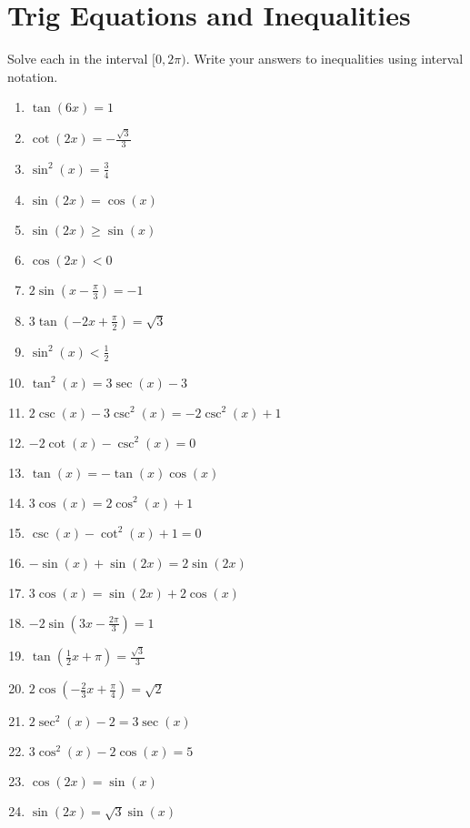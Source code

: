 \chapter{Trig Equations and Inequalities}

Solve each in the interval $[0,2\pi)$. Write your answers to inequalities using interval notation.

\begin{enumerate}
	\item $\tan(6x) = 1$
    \item $\cot(2x) = -\frac{\sqrt{3}}{3}$
    \item $\sin^2 (x) = \frac{3}{4}$
    \item $\sin(2x) = \cos(x)$
    \item $\sin(2x) \geq \sin(x)$
    \item $\cos(2x) < 0$
    \item $2\sin\left(x-\frac{\pi}{3}\right) = -1$
    \item $3\tan\left(-2x+\frac{\pi}{2}\right)=\sqrt{3}$
    \item $\sin^2(x) < \frac{1}{2}$
    
    \item $\tan^2(x) = 3\sec(x) - 3$
    \item $2\csc(x) - 3\csc^2(x) = -2\csc^2(x) + 1$
    \item $-2\cot(x) - \csc^2(x) = 0$
    \item $\tan(x) = -\tan(x)\cos(x)$
    \item $3\cos(x) = 2\cos^2(x) + 1$
    \item $\csc(x) - \cot^2(x) + 1 = 0$
    \item $-\sin(x) + \sin(2x) = 2\sin(2x)$
    \item $3\cos(x) = \sin(2x) + 2\cos(x)$
    
    \item $-2\sin\left(3x-\frac{2\pi}{3}\right) = 1$
    \item $\tan\left(\frac{1}{2}x + \pi\right) = \frac{\sqrt{3}}{3}$
    \item $2\cos\left(-\frac{2}{3}x+\frac{\pi}{4}\right) = \sqrt{2}$
    
    \item $2\sec^2(x) - 2 = 3\sec(x)$
	\item $3\cos^2(x) - 2\cos(x) = 5$
	\item $\cos(2x) = \sin(x)$
	\item $\sin(2x) = \sqrt{3} \sin(x)$
\end{enumerate}

